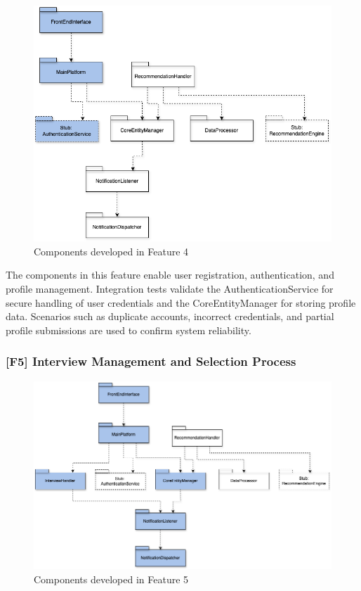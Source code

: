 \begin{figure}[H]
    \centering
    \includegraphics[width=\textwidth]{Images/implementation-testing-hierarchy_f4.png}
    \caption{Components developed in Feature 4}
    \label{fig:implementation_testing_f4}
\end{figure}

The components in this feature enable user registration, authentication, and profile management. Integration tests validate the AuthenticationService for secure handling of user credentials and the CoreEntityManager for storing profile data. Scenarios such as duplicate accounts, incorrect credentials, and partial profile submissions are used to confirm system reliability.

\subsubsection{[F5] Interview Management and Selection Process}

\begin{figure}[H]
    \centering
    \includegraphics[width=\textwidth]{Images/implementation-testing-hierarchy_f5.png}
    \caption{Components developed in Feature 5}
    \label{fig:implementation_testing_f5}
\end{figure}

